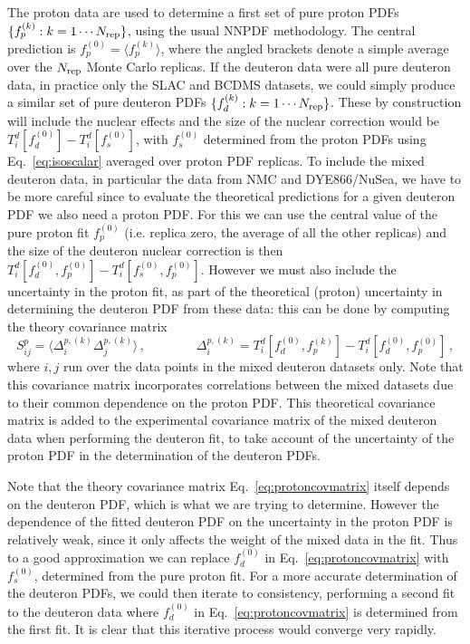 \documentclass[11pt,a4paper]{article}
\begin{document}
The proton data are used to determine a first set of pure proton PDFs
$\{f_p^{(k)}: k=1\cdots N_{\rm rep}\}$, using the usual NNPDF methodology.
The central prediction is $f_p^{(0)} = \langle f_p^{(k)}\rangle$, where the
angled brackets denote a simple average over the $N_{\rm rep}$ Monte Carlo
replicas. If the deuteron data were all pure deuteron data, in practice only
the SLAC and BCDMS datasets, we could simply produce a similar
set of pure deuteron PDFs $\{f_d^{(k)}: k=1\cdots N_{\rm rep}\}$.
These by construction will include the nuclear effects and the size of the
nuclear correction would be $T_i^d[f_d^{(0)}]-T_i^d[f_s^{(0)}]$,
with $f_s^{(0)}$ determined from the proton PDFs using
Eq.~\eqref{eq:isoscalar} averaged over proton PDF replicas.
To include the mixed deuteron data, in particular the data from NMC and
DYE866/NuSea, we have to be more careful since to evaluate the theoretical
predictions for a given deuteron PDF we also need  
a proton PDF. For this we can use the central value of the pure proton fit
$f_p^{(0)}$ (i.e. replica zero, the average of all the other replicas) and the
size of the deuteron nuclear correction is then
$T_i^d[f_d^{(0)},f_p^{(0)}]-T_i^d[f_s^{(0)},f_p^{(0)}]$. However we must also include
the uncertainty in the proton fit, as part of the theoretical (proton)
uncertainty in determining the deuteron PDF from these data: this can be done
by computing the theory covariance matrix 
\begin{equation}
  S_{ij}^p
  =
  \langle\Delta_i^{p,(k)}\Delta_j^{p,(k)}\rangle\,,
  \qquad\qquad
  \Delta_i^{p,(k)}=T_i^d[f_d^{(0)},f_p^{(k)}]-T_i^d[f_d^{(0)},f_p^{(0)}]\,,
  \label{eq:protoncovmatrix}
\end{equation}
where $i,j$ run over the data points in the mixed deuteron datasets only. Note
that this covariance matrix incorporates correlations between the mixed
datasets due to their common dependence on the proton PDF. This theoretical
covariance matrix is added to the experimental covariance matrix of the mixed
deuteron data when performing the deuteron fit, to take account of the
uncertainty of the proton PDF in the determination of the deuteron PDFs.

Note that the theory covariance matrix Eq.~\eqref{eq:protoncovmatrix} itself
depends on the deuteron PDF, which is what we are trying to determine. However 
the dependence of the fitted deuteron PDF on the uncertainty in the proton PDF
is relatively weak, since it only affects the weight of the mixed data in the
fit. Thus to a good approximation we can replace $f_d^{(0)}$ in
Eq.~\eqref{eq:protoncovmatrix} with $f_s^{(0)}$, determined from the pure
proton fit. For a more accurate determination of the deuteron PDFs, we could
then iterate to consistency, performing a second fit to the deuteron data where
$f_d^{(0)}$ in Eq.~\eqref{eq:protoncovmatrix} is determined from the first fit.
It is clear that this iterative process would converge very rapidly. 
\end{document}
